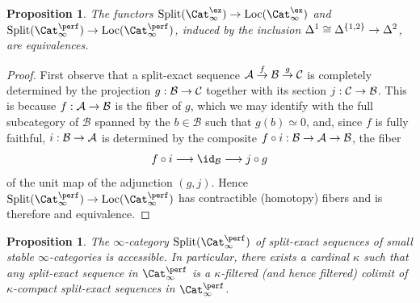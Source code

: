 \documentclass{amsart}
\renewcommand{\to}{\mathchoice{\longrightarrow}{\rightarrow}{\rightarrow}{\rightarrow}}
\let\catsymbfont\mathcal
\newcommand{\aA}{{\catsymbfont{A}}}
\newcommand{\aB}{{\catsymbfont{B}}}
\newcommand{\aC}{{\catsymbfont{C}}}
\newcommand{\stabcat}{\Cat_\i^{\ex}}
\newcommand{\idemstabcat}{\Cat_\i^{\perf}}
\renewcommand{\i}{\infty}
\numberwithin{equation}{section}
\newtheorem{proposition}[equation]{Proposition}
\theoremstyle{definition}
\begin{document}
\begin{proposition}\label{prop:split=loc}
The functors $\mathrm{Split}(\stabcat)\to\mathrm{Loc}(\stabcat)$ and $\mathrm{Split}(\idemstabcat)\to\mathrm{Loc}(\idemstabcat)$, induced by the inclusion $\Delta^1\cong\Delta^{\{1,2\}}\to\Delta^2$, are equivalences.
\end{proposition}

\begin{proof}
First observe that a split-exact sequence $\aA\overset{f}{\to}\aB\overset{g}{\to}\aC$ is completely determined by the projection $g:\aB\to\aC$
together with its section $j:\aC\to\aB$.
This is because $f:\aA\to\aB$ is the fiber of $g$, which we may identify with the full subcategory of $\aB$ spanned by the $b\in\aB$ such that $g(b)\simeq 0$, and, since $f$ is fully faithful, $i:\aB\to\aA$ is determined by the composite $f\circ i:\aB\to\aA\to\aB$, the fiber
\[
f\circ i\to\id_{\aB}\to j\circ g
\]
of the unit map of the adjunction $(g,j)$.
Hence $\mathrm{Split}(\idemstabcat)\to\mathrm{Loc}(\idemstabcat)$
has contractible (homotopy) fibers and is therefore and equivalence.
\end{proof}

\begin{proposition}\label{prop:splitapprox}
The $\i$-category $\mathrm{Split}(\idemstabcat)$ of split-exact
sequences of small stable $\i$-categories is accessible.  In
particular, there exists a cardinal $\kappa$ such that any split-exact
sequence in $\idemstabcat$ is a $\kappa$-filtered (and hence filtered)
colimit of $\kappa$-compact split-exact sequences in $\idemstabcat$.
\end{proposition}
\end{document}
